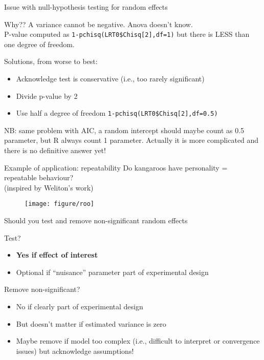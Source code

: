 \documentclass{beamer}
\begin{document}
\begin{frame}{Issue with null-hypothesis testing for random effects}
\begin{alertblock}{Why??}
    A variance cannot be negative. Anova doesn't know.\\
    P-value computed as \texttt{1-pchisq(LRT0\$Chisq[2],df=1)} but there is LESS than one degree of freedom.
\end{alertblock}
\pause
\begin{exampleblock}{Solutions, from worse to best:}
    \begin{itemize}
     \item Acknowledge test is conservative (i.e., too rarely significant) 
     \item Divide p-value by 2
     \item Use half a degree of freedom \texttt{1-pchisq(LRT0\$Chisq[2],df=0.5)} 
    \end{itemize}

\end{exampleblock}

\pause
NB: same problem with AIC, a random intercept should maybe count as 0.5 parameter, but R always count 1 parameter. Actually it is more complicated and there is no definitive answer yet! 

\end{frame}

\begin{frame}{Example of application: repeatability}
 Do kangaroos have personality = repeatable behaviour?\\(inspired by Weliton's work)
 \begin{figure}
 \texttt{[image: figure/roo]}
 \end{figure}
 
 
\end{frame}

\begin{frame}{Should you test and remove non-significant random effects}
 
 \begin{block}{Test?}
    \begin{itemize}
     \item \textbf{Yes if effect of interest}
     \item Optional if ``nuisance'' parameter part of experimental design
    \end{itemize}
\end{block}
\pause
 \begin{block}{Remove non-significant?}
    \begin{itemize}
     \item No if clearly part of experimental design
     \item But doesn't matter if estimated variance is zero
     \item Maybe remove if model too complex (i.e., difficult to interpret or convergence issues) but acknowledge assumptions!
    \end{itemize}
\end{block}
 
\end{frame}
\end{document}
